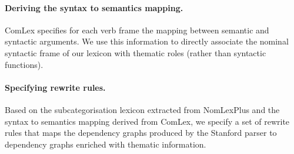 \documentclass[twocolumn,10pt]{article}
\begin{document}
\paragraph{Deriving the syntax to semantics mapping.}
ComLex specifies for each verb frame the mapping between
semantic and syntactic arguments.%
We use this information to directly associate the nominal syntactic
frame of our lexicon with thematic roles (rather than syntactic
functions). %
\paragraph{Specifying rewrite rules.}
Based on the subcategorisation lexicon extracted from NomLexPlus and
the syntax to semantics mapping derived from ComLex, we specify
a set of rewrite rules that maps the dependency graphs produced by the
Stanford parser to dependency graphs enriched with thematic 
information. 
\end{document}
